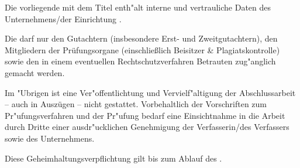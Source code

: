 Die vorliegende \art mit dem Titel \titel enth"alt interne und vertrauliche Daten des Unternehmens/der Einrichtung \unternehmen.

Die \art darf nur den Gutachtern (insbesondere Erst- und Zweitgutachtern), den Mitgliedern der Prüfungsorgane (einschließlich Beisitzer \& Plagiatskontrolle) sowie den in einem eventuellen Rechtschutzverfahren Betrauten zug"anglich gemacht werden.

Im "Ubrigen ist eine Ver"offentlichtung und Vervielf"altigung der Abschlussarbeit -- auch in Auszügen -- nicht gestattet. Vorbehaltlich der Vorschriften zum Pr"ufungsverfahren und der Pr"ufung bedarf eine Einsichtnahme in die Arbeit durch Dritte einer ausdr"ucklichen Genehmigung der Verfasserin/des Verfassers sowie des \oa Unternehmens.

Diese Geheimhaltungsverpflichtung gilt bis zum Ablauf des \datumAblaufSperrvermerk.
